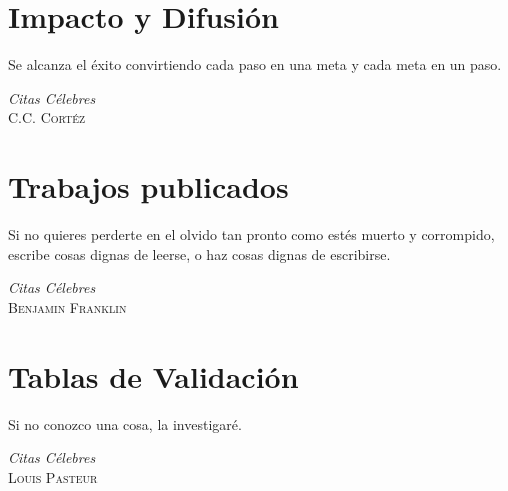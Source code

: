 \documentclass[a4paper,final,11pt,fleqn]{book}  %
\begin{document}
\chapter{\label{capitulo:impacto}Impacto y Difusión}\label{impacto}
\epigraph{Se alcanza el éxito convirtiendo cada paso en una meta y cada meta en un paso.}
{\textit{Citas Célebres}\\ \textsc{C.C. Cortéz}}
%
\chapter{\label{capitulo:publicaciones}Trabajos publicados}
\epigraph{Si no quieres perderte en el olvido tan pronto como estés muerto y corrompido, \\ escribe cosas dignas de leerse, o haz cosas dignas de escribirse.}
{\textit{Citas Célebres}\\ \textsc{Benjamin Franklin}}
%
\chapter{\label{capitulo:tablas}Tablas de Validación}\label{tablas-validacion-apen}
\epigraph{Si no conozco una cosa, la investigaré.}
{\textit{Citas Célebres}\\ \textsc{Louis Pasteur}}
%
% 
% 
% 
% 
% 
% 


\backmatter


\printindex
\printglossaries


\insertbibliography
\end{document}
